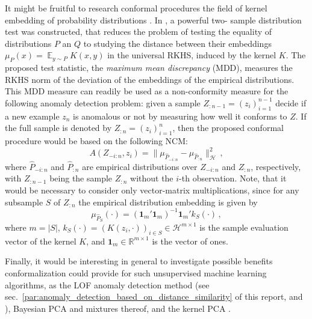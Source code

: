 \documentclass[a4paper,14pt]{extarticle}
\newcommand{\ex}{\mathop{\mathbb{E}}\nolimits}
\newcommand{\Hcal}{\mathcal{H}}
\newcommand{\Real}{\mathbb{R}}
\newcommand{\one}{\mathbf{1}}
\begin{document}
It might be fruitful to research conformal procedures the field of kernel embedding
of probability distributions \cite{smola2007}. In \cite{gretton2012}, a powerful two-
sample distribution test was constructed, that reduces the problem of testing the
equality of distributions $P$ an $Q$ to studying the distance between their embeddings
$\mu_P(x) = \ex_{y\sim P} K(x, y)$ in the universal RKHS, induced by the kernel $K$.
The proposed test statistic, the \textit{maximum mean discrepancy} (MDD), measures
the RKHS norm of the deviation of the embeddings of the empirical distributions.
This MDD measure can readily be used as a non-conformity measure for the following
anomaly detection problem: given a sample $Z_{:n-1} = (z_i)_{i=1}^{n-1}$ decide if
a new example $z_n$ is anomalous or not by measuring how well it conforms to $Z$.
If the full sample is denoted by $Z_{:n} = (z_i)_{i=1}^n$, then the proposed conformal
procedure would be based on the following NCM:
\begin{equation*}
  A(Z_{-i:n}, z_i) = \| \mu_{\hat{P}_{-i:n}} - \mu_{\hat{P}_{:n}} \|^2_{\Hcal} \,,
\end{equation*}
where $\hat{P}_{-i:n}$ and $\hat{P}_{:n}$ are empirical distributions over $Z_{-i:n}$
and $Z_{:n}$, respectively, with $Z_{:n-1}$ being the sample $Z_{:n}$ without the
$i$-th observation. Note, that it would be necessary to consider only vector-matrix
multiplications, since for any subsample $S$ of $Z_{:n}$ the empirical distribution
embedding is given by
\begin{equation*}
  \mu_{\hat{P}_S}(\cdot) = (\one_m'\one_m)^{-1} \one_m' k_S(\cdot) \,,
\end{equation*}
where $m = |S|$, $k_S(\cdot) = (K(z_i, \cdot))_{i\in S} \in \Hcal^{m\times 1}$ is
the sample evaluation vector of the kernel $K$, and $\one_m \in \Real^{m\times 1}$
is the vector of ones.

Finally, it would be interesting in general to investigate possible benefits conformalization
could provide for such unsupervised machine learning algorithms, as the LOF anomaly
detection method (see sec.~\ref{par:anomaly_detection_based_on_distance_similarity}
of this report, and \cite{breunig2000}), Bayesian PCA \cite{tippnigbishop1999} and
mixtures thereof, and the kernel PCA \cite{hoffmann2007}.


% 
\clearpage


\end{document}
